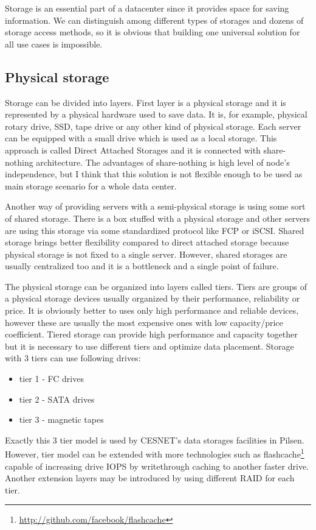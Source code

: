 

Storage is an essential part of a datacenter since it provides space for saving information. We can distinguish among different types of storages and dozens of storage access methods, so it is obvious that building one universal solution for all use cases is impossible. 

\subsection{Physical storage}
Storage can be divided into layers. First layer is a physical storage and it is represented by a physical hardware used to save data. It is, for example, physical rotary drive, \Ac{SSD}, tape drive or any other kind of physical storage. Each server can be equipped with a small drive which is used as a local storage. This approach is called Direct Attached Storages and it is connected with share-nothing architecture. The advantages of share-nothing is high level of node's independence, but I think that this solution is not flexible enough to be used as main storage scenario for a whole data center.

Another way of providing servers with a semi-physical storage is using some sort of shared storage. There is a box stuffed with a physical storage and other servers are using this storage via some standardized protocol like \Ac{FCP} or \Ac{iSCSI}. Shared storage brings better flexibility compared to direct attached storage because physical storage is not fixed to a single server. However, shared storages are usually centralized too and it is a bottleneck and a single point of failure.

The physical storage can be organized into layers called tiers. Tiers are groups of a physical storage devices usually organized by their performance, reliability or price. It is obviously better to uses only high performance and reliable devices, however these are usually the most expensive ones with low capacity/price coefficient. Tiered storage can provide high performance and capacity together but it is necessary to use different tiers and optimize data placement. Storage with 3 tiers can use following drives:
\begin{itemize}
	\item tier 1 - \Ac{FC} drives
	\item tier 2 - \Ac{SATA} drives
	\item tier 3 - magnetic tapes
\end{itemize}
Exactly this 3 tier model is used by CESNET's data storages facilities in Pilsen. However, tier model can be extended with more technologies such as flashcache\footnote{\url{http://github.com/facebook/flashcache}} capable of increasing drive \Ac{IOPS} by writethrough caching to another faster drive. Another extension layers may be introduced by using different \Ac{RAID} for each tier.

